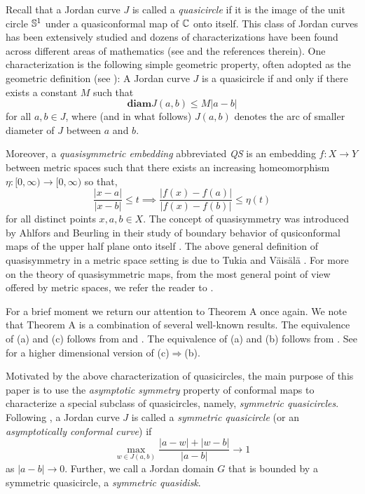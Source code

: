 \documentclass[11pt]{amsart}
\numberwithin{equation}{section}
\theoremstyle{plain}
\theoremstyle{step}
\def\leq{\leqslant}
\newcommand{\abs}[1]{\lvert#1\rvert}
\newcommand{\Ss}{\Bbb{S}^1}
\newcommand{\C}{\Bbb{C}}
\begin{document}
\vspace{0.5cm}
Recall that a Jordan curve $J$ is called a {\it quasicircle} if it is the image  of the unit circle $\Ss$ under a quasiconformal map of $\C$ onto itself. This class of Jordan curves has been extensively studied and dozens of characterizations have been found across different areas of mathematics (see \cite{gehring2012ubiquitous} and the references therein). One characterization is the following simple geometric property, often adopted as the geometric definition (see \cite[Definition~5.4]{pommerenke2013boundary}):
A Jordan curve $J$ is a quasicircle if and only if there exists a constant $M$ such that 
\begin{equation}
    {\textbf{diam}}J(a,b)\leq M|a-b|
\end{equation}
for all $a,b\in J$, where (and in what follows) $J(a,b)$ denotes the arc of smaller diameter of $J$ between $a$ and $b$. \par
Moreover, a {\it quasisymmetric embedding} abbreviated {\it QS} is an embedding $f\colon X\to Y$ between metric spaces such that there exists an increasing homeomorphism $\eta\colon [0,\infty)\to [0,\infty)$ so that, 
\begin{equation}
    \frac{\abs{x-a}}{\abs{x-b}}\leq t\implies \frac{\abs{f(x)-f(a)}}{\abs{f(x)-f(b)}}\leq \eta(t)
\end{equation}
for all distinct points $x, a, b\in X$. 
The concept of quasisymmetry was introduced by Ahlfors and Beurling in their study of boundary behavior of qusiconformal maps of the upper half plane onto itself \cite{boundary_correspondence}. The above general definition of quasisymmetry in a metric space setting is due to Tukia and V\"ais\"al\"a \cite{tukia1980quasisymmetric}.
For more on the theory of quasisymmetric maps, from the most general point of view offered by metric spaces, we refer the reader to \cite{heinonen2001lectures}.

For a brief moment we return our attention to Theorem A once again. We note that Theorem A is a combination of several well-known results. The equivalence of (a) and (c) follows from \cite[Proposition~5.10]{pommerenke2013boundary} and \cite[Theorem~5.11]{pommerenke2013boundary}. The equivalence of (a) and (b) follows from \cite{tukia1980quasisymmetric}. See \cite[Theorem~3.12]{MR1057080} for a higher dimensional version of (c)$\Rightarrow$(b).

Motivated by the above characterization of quasicircles, the main purpose of this paper is to use the {\it asymptotic symmetry} property of conformal maps to characterize a special subclass of quasicircles, namely, {\it symmetric quasicircles}. 
Following \cite[Section~11.2]{pommerenke2013boundary}, a Jordan curve $J$ is called a {\it symmetric quasicircle} (or an {\it asymptotically conformal curve}) if 
\begin{equation}
    \max_{w\in J(a,b)}\frac{\abs{a-w}+\abs{w-b}}{\abs{a-b}}\to 1
\end{equation}
as $\abs{a-b}\to 0$. Further, we call a Jordan domain $G$ that is bounded by a symmetric quasicircle, a {\it symmetric quasidisk}. 
\end{document}
